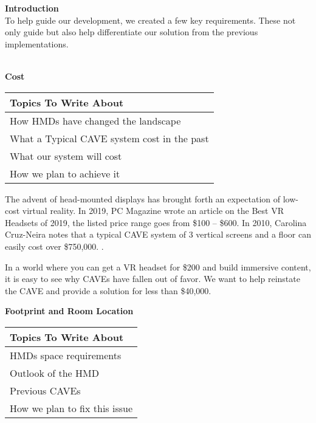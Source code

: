 


\noindent\textbf{Introduction}\\
	To help guide our development, we created a few key requirements. These not only guide but also help differentiate our solution from the previous implementations.


{} \\

\noindent\textbf{Cost}\\
    \begin{center}
        \begin{table}[H]
            \centering
            \renewcommand\arraystretch{0.5}
            \begin{tabular}{|l|}
                \hline 
                Topics To Write About \\ 
                \hline 
                How HMDs have changed the landscape \\  
                What a Typical CAVE system cost in the past \\
                What our system will cost  \\
                How we plan to achieve it \\
                \hline 
            \end{tabular}
        \end{table}
    \end{center}


	The advent of head-mounted displays has brought forth an expectation of low-cost virtual reality. In 2019, PC Magazine  wrote an article on the Best VR Headsets of 2019, the listed price range goes from \$100 -- \$600. \cite{bestHMDs} 
	In 2010, Carolina Cruz-Neira notes that a typical CAVE system of 3 vertical screens and a floor can easily cost over \$750,000. \cite{ccnSurround}. 
	
	In a world where you can get a VR headset for \$200 and build immersive content, it is easy to see why CAVEs have fallen out of favor. We want to help reinstate the CAVE and provide a solution for less than \$40,000.

\filbreak
\noindent\textbf{Footprint and Room Location}\\
    \begin{center}
        \begin{table}[H]
            \centering
            \renewcommand\arraystretch{0.5}
            \begin{tabular}{|l|}
                \hline 
                Topics To Write About \\ 
                \hline 
                HMDs space requirements \\  
                Outlook of the HMD  \\
                Previous CAVEs \\
                How we plan to fix this issue \\
                \hline 
            \end{tabular}
        \end{table}
    \end{center}
    
